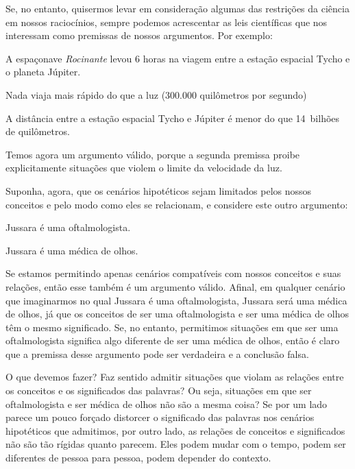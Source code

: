 Se, no entanto, quisermos levar em consideração algumas das restrições da ciência em nossos raciocínios, sempre podemos acrescentar as leis científicas que nos interessam como premissas de nossos argumentos.
Por exemplo:
	\begin{earg}
		\item[] A espaçonave \emph{Rocinante} levou 6 horas na viagem entre a estação espacial Tycho e o planeta Júpiter.
		\item[] Nada viaja mais rápido do que a luz (300.000 quilômetros por segundo)
		\item[\therefore] A distância entre a estação espacial Tycho e Júpiter é menor do que 14~bilhões de quilômetros.
	\end{earg}
Temos agora um argumento válido, porque a segunda premissa proibe explicitamente situações que violem o limite da velocidade da luz.

Suponha, agora, que os cenários hipotéticos sejam limitados pelos nossos conceitos e pelo modo como eles se relacionam, e considere este outro argumento:
	\begin{earg}
		\item[] Jussara é uma oftalmologista.
		\item[\therefore] Jussara é uma médica de olhos.
	\end{earg}
Se estamos permitindo apenas cenários compatíveis com nossos conceitos e suas relações, então esse também é um argumento válido.
Afinal, em qualquer cenário que imaginarmos no qual Jussara é uma oftalmologista, Jussara será uma médica de olhos, já que os conceitos de ser uma oftalmologista e ser uma médica de olhos têm o mesmo significado.
Se, no entanto, permitimos situações em que ser uma oftalmologista significa algo diferente de ser uma médica de olhos, então é claro que a premissa desse argumento pode ser verdadeira e a conclusão falsa.

O que devemos fazer?
Faz sentido admitir situações que violam as relações entre os conceitos e os significados das palavras?
Ou seja, situações em que ser oftalmologista e ser médica de olhos não são a mesma coisa?
Se por um lado parece um pouco forçado distorcer o significado das palavras nos cenários hipotéticos que admitimos, por outro lado, as relações de conceitos e significados não são tão rígidas quanto parecem.
Eles podem mudar com o tempo, podem ser diferentes de pessoa para pessoa, podem depender do contexto.

